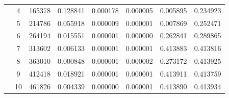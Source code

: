 \begin{tabular}{c c |  c  c  c  c  c }
 & 4 & 165378 & 0.128841 & 0.000178 & 0.000005 & 0.005895 & 0.234923 \\
 & 5 & 214786 & 0.055918 & 0.000009 & 0.000001 & 0.007869 & 0.252471 \\
 & 6 & 264194 & 0.015551 & 0.000001 & 0.000000 & 0.262841 & 0.289865 \\
 & 7 & 313602 & 0.006133 & 0.000001 & 0.000001 & 0.413883 & 0.413816 \\
 & 8 & 363010 & 0.000848 & 0.000001 & 0.000002 & 0.273172 & 0.413925 \\
 & 9 & 412418 & 0.018921 & 0.000001 & 0.000001 & 0.413911 & 0.413759 \\
 & 10 & 461826 & 0.004339 & 0.000000 & 0.000001 & 0.413890 & 0.413934 \\
\hline
\end{tabular}

